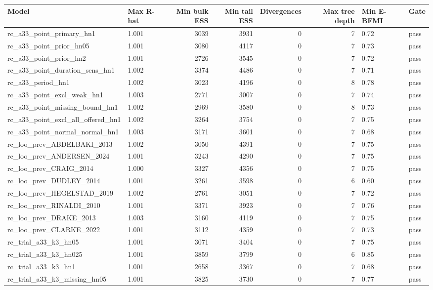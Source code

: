
\begin{tabular}{llrrrrll}
\toprule
Model & Max R-hat & Min bulk ESS & Min tail ESS & Divergences & Max tree depth & Min E-BFMI & Gate\\
\midrule
rc\_a33\_point\_primary\_hn1 & 1.001 & 3039 & 3931 & 0 & 7 & 0.72 & pass\\
rc\_a33\_point\_prior\_hn05 & 1.001 & 3080 & 4117 & 0 & 7 & 0.73 & pass\\
rc\_a33\_point\_prior\_hn2 & 1.001 & 2726 & 3545 & 0 & 7 & 0.72 & pass\\
rc\_a33\_point\_duration\_sens\_hn1 & 1.002 & 3374 & 4486 & 0 & 7 & 0.71 & pass\\
rc\_a33\_period\_hn1 & 1.002 & 3023 & 4196 & 0 & 8 & 0.78 & pass\\
rc\_a33\_point\_excl\_weak\_hn1 & 1.003 & 2771 & 3007 & 0 & 7 & 0.74 & pass\\
rc\_a33\_point\_missing\_bound\_hn1 & 1.002 & 2969 & 3580 & 0 & 8 & 0.73 & pass\\
rc\_a33\_point\_excl\_all\_offered\_hn1 & 1.002 & 3264 & 3754 & 0 & 7 & 0.75 & pass\\
rc\_a33\_point\_normal\_normal\_hn1 & 1.003 & 3171 & 3601 & 0 & 7 & 0.68 & pass\\
rc\_loo\_prev\_ABDELBAKI\_2013 & 1.002 & 3050 & 4391 & 0 & 7 & 0.75 & pass\\
rc\_loo\_prev\_ANDERSEN\_2024 & 1.001 & 3243 & 4290 & 0 & 7 & 0.75 & pass\\
rc\_loo\_prev\_CRAIG\_2014 & 1.000 & 3327 & 4356 & 0 & 7 & 0.75 & pass\\
rc\_loo\_prev\_DUDLEY\_2014 & 1.001 & 3261 & 3598 & 0 & 6 & 0.60 & pass\\
rc\_loo\_prev\_HEGELSTAD\_2019 & 1.002 & 2761 & 3051 & 0 & 7 & 0.72 & pass\\
rc\_loo\_prev\_RINALDI\_2010 & 1.001 & 3371 & 3923 & 0 & 7 & 0.76 & pass\\
rc\_loo\_prev\_DRAKE\_2013 & 1.003 & 3160 & 4119 & 0 & 7 & 0.75 & pass\\
rc\_loo\_prev\_CLARKE\_2022 & 1.001 & 3112 & 4359 & 0 & 7 & 0.73 & pass\\
rc\_trial\_a33\_k3\_hn05 & 1.001 & 3071 & 3404 & 0 & 7 & 0.75 & pass\\
rc\_trial\_a33\_k3\_hn025 & 1.001 & 3859 & 3799 & 0 & 6 & 0.85 & pass\\
rc\_trial\_a33\_k3\_hn1 & 1.001 & 2658 & 3367 & 0 & 7 & 0.68 & pass\\
rc\_trial\_a33\_k3\_missing\_hn05 & 1.001 & 3825 & 3730 & 0 & 7 & 0.77 & pass\\

\end{tabular}

